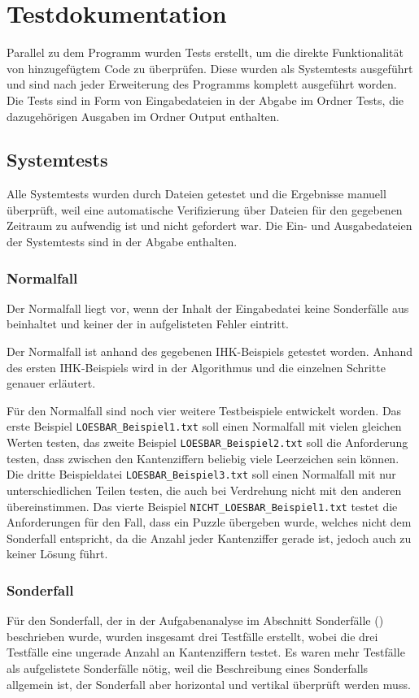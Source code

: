 \chapter{Testdokumentation}
\label{chap:Testdokumentation}
Parallel zu dem Programm wurden Tests erstellt, um die direkte Funktionalität von hinzugefügtem Code zu überprüfen. Diese wurden als Systemtests ausgeführt und sind nach jeder Erweiterung des Programms komplett ausgeführt worden. Die Tests sind in Form von Eingabedateien in der Abgabe im Ordner Tests, die dazugehörigen Ausgaben im Ordner Output enthalten.

\section{Systemtests}
Alle Systemtests wurden durch Dateien getestet und die Ergebnisse manuell überprüft, weil eine automatische Verifizierung über Dateien für den gegebenen Zeitraum zu aufwendig ist und nicht gefordert war. Die Ein- und Ausgabedateien der Systemtests sind in der Abgabe enthalten.

\subsection{Normalfall}
Der Normalfall liegt vor, wenn der Inhalt der Eingabedatei keine Sonderfälle aus  beinhaltet und keiner der in  aufgelisteten Fehler eintritt.

Der Normalfall ist anhand des gegebenen IHK-Beispiels getestet worden. Anhand des ersten IHK-Beispiels wird in  der Algorithmus und die einzelnen Schritte genauer erläutert.

Für den Normalfall sind noch vier weitere Testbeispiele entwickelt worden. Das erste Beispiel \lstinline{LOESBAR_Beispiel1.txt} soll einen Normalfall mit vielen gleichen Werten testen, das zweite Beispiel \lstinline{LOESBAR_Beispiel2.txt} soll die Anforderung testen, dass zwischen den Kantenziffern beliebig viele Leerzeichen sein können. Die dritte Beispieldatei \lstinline{LOESBAR_Beispiel3.txt} soll einen Normalfall mit nur unterschiedlichen Teilen testen, die auch bei Verdrehung nicht mit den anderen übereinstimmen. Das vierte Beispiel \lstinline{NICHT_LOESBAR_Beispiel1.txt} testet die Anforderungen für den Fall, dass ein Puzzle übergeben wurde, welches nicht dem Sonderfall entspricht, da die Anzahl jeder Kantenziffer gerade ist, jedoch auch zu keiner Lösung führt.

\subsection{Sonderfall}
Für den Sonderfall, der in der Aufgabenanalyse im Abschnitt Sonderfälle () beschrieben wurde, wurden insgesamt drei Testfälle erstellt, wobei die drei Testfälle eine ungerade Anzahl an Kantenziffern testet. Es waren mehr Testfälle als aufgelistete Sonderfälle nötig, weil die Beschreibung eines Sonderfalls allgemein ist, der Sonderfall aber horizontal und vertikal überprüft werden muss.

